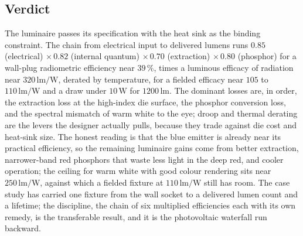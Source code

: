 \subsection{Verdict}

The luminaire passes its specification with the heat sink as the binding
constraint. The chain from electrical input to delivered lumens runs
$0.85$ (electrical) $\times\,0.82$ (internal quantum) $\times\,0.70$
(extraction) $\times\,0.80$ (phosphor) for a wall-plug radiometric
efficiency near $39\,\%$, times a luminous efficacy of radiation near
$320\,\si{\lumen\per\watt}$, derated by temperature, for a fielded
efficacy near $105$ to $110\,\si{\lumen\per\watt}$ and a draw under
$10\,\si{\watt}$ for $1200\,\si{\lumen}$. The dominant losses are, in
order, the extraction loss at the high-index die surface, the phosphor
conversion loss, and the spectral mismatch of warm white to the eye;
droop and thermal derating are the levers the designer actually pulls,
because they trade against die cost and heat-sink size. The honest reading
is that the blue emitter is already near its practical efficiency, so the
remaining luminaire gains come from better extraction, narrower-band red
phosphors that waste less light in the deep red, and cooler operation; the
ceiling for warm white with good colour rendering sits near
$250\,\si{\lumen\per\watt}$, against which a fielded fixture at
$110\,\si{\lumen\per\watt}$ still has room. The case study has carried one
fixture from the wall socket to a delivered lumen count and a lifetime;
the discipline, the chain of six multiplied efficiencies each with its own
remedy, is the transferable result, and it is the photovoltaic waterfall
run backward.

